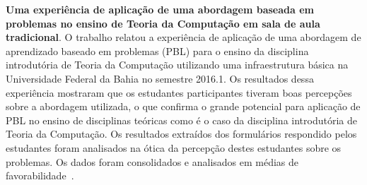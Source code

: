 \item{\textbf{Uma experiência de aplicação de uma
abordagem baseada em problemas no ensino
de Teoria da Computação em sala de aula tradicional}.
O trabalho relatou a experiência de aplicação de uma
abordagem de aprendizado baseado em problemas (PBL) para o ensino da
disciplina introdutória de Teoria da Computação utilizando uma
infraestrutura básica na Universidade Federal da Bahia no
semestre 2016.1.
Os resultados dessa experiência mostraram que os estudantes participantes
tiveram boas percepções sobre a abordagem utilizada, o que confirma o
grande potencial para aplicação de PBL no ensino de
disciplinas teóricas como é o caso da disciplina introdutória de
Teoria da Computação.
Os resultados extraídos dos formulários respondido pelos estudantes
foram analisados na ótica da percepção
destes estudantes sobre os problemas.
Os dados foram consolidados e analisados em médias
de favorabilidade~\cite{gavaza2017}.}

